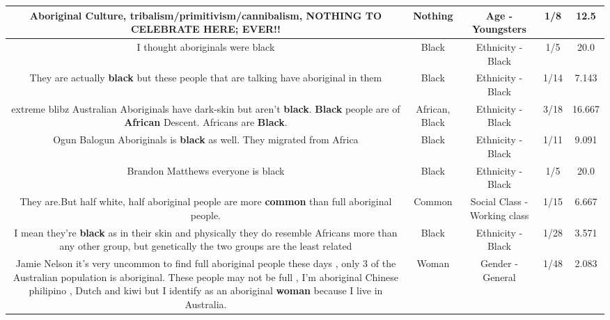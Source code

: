 \documentclass[11pt]{article}
\newlength\mylength
\begin{document}
\begin{center}
\begin{longtable}{|C{.65\mylength}|C{.30\mylength}|C{.12\mylength}|C{.12\mylength}|C{.12\mylength}|}
  \small Aboriginal Culture, tribalism/primitivism/cannibalism, \textbf{NOTHING} TO CELEBRATE HERE; EVER!!\normalsize   & Nothing & Age - Youngsters & 1/8 & 12.5 \\  \hline
  \small I thought aboriginals were black\normalsize   & Black & Ethnicity - Black & 1/5 & 20.0 \\  \hline
  \small They are actually \textbf{black} but these people that are talking have aboriginal in them\normalsize   & Black & Ethnicity - Black & 1/14 & 7.143 \\  \hline
  \small extreme blibz Australian Aboriginals have dark-skin but aren't \textbf{black}. \textbf{Black} people are of \textbf{African} Descent. Africans are \textbf{Black}.\normalsize   & African, Black & Ethnicity - Black & 3/18 & 16.667 \\  \hline
  \small Ogun Balogun Aboriginals is \textbf{black} as well. They migrated from Africa\normalsize   & Black & Ethnicity - Black & 1/11 & 9.091 \\  \hline
  \small Brandon Matthews everyone is black\normalsize   & Black & Ethnicity - Black & 1/5 & 20.0 \\  \hline
  \small They are.But half white, half aboriginal people are more \textbf{common} than full aboriginal people.\normalsize   & Common & Social Class - Working class & 1/15 & 6.667 \\  \hline
  \small I mean they're \textbf{black} as in their skin and physically they do resemble Africans more than any other group, but genetically the two groups are the least related\normalsize   & Black & Ethnicity - Black & 1/28 & 3.571 \\  \hline
  \small Jamie Nelson it's very uncommon to find full aboriginal people these days , only 3 of the Australian population is aboriginal. These people may not be full , I'm aboriginal Chinese philipino , Dutch and kiwi but I identify as an aboriginal \textbf{woman} because I live in Australia.\normalsize   & Woman & Gender - General & 1/48 & 2.083 \\  \hline

\end{longtable}
\end{center}
\end{document}
